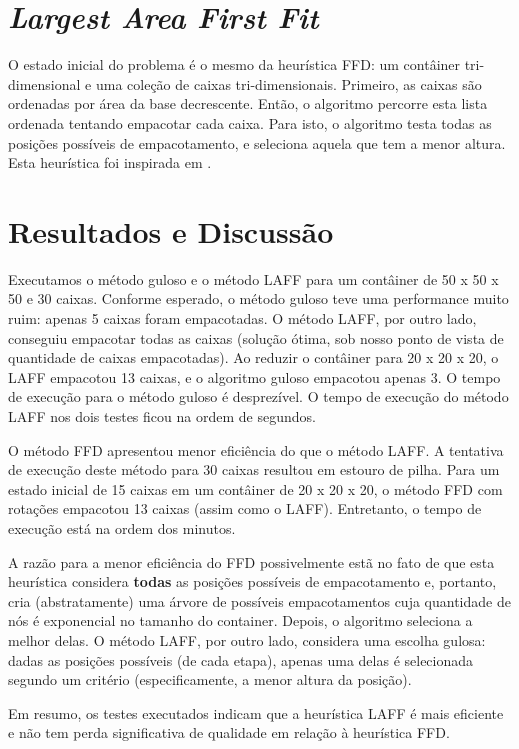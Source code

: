 \documentclass[12pt]{article}
\begin{document}
\section{\emph{Largest Area First Fit}}

O estado inicial do problema é o mesmo da heurística FFD: um contâiner tri-dimensional e uma coleção de caixas tri-dimensionais. Primeiro, as caixas são ordenadas por área da base decrescente. Então, o algoritmo percorre esta lista ordenada tentando empacotar cada caixa. Para isto, o algoritmo testa todas as posições possíveis de empacotamento, e seleciona aquela que tem a menor altura. Esta heurística foi inspirada em \cite{gurbuz}.

\section{Resultados e Discussão}

Executamos o método guloso e o método LAFF para um contâiner de 50 x 50 x 50 e 30 caixas. Conforme esperado, o método guloso teve uma performance muito ruim: apenas 5 caixas foram empacotadas. O método LAFF, por outro lado, conseguiu empacotar todas as caixas (solução ótima, sob nosso ponto de vista de quantidade de caixas empacotadas). Ao reduzir o contâiner para 20 x 20 x 20, o LAFF empacotou 13 caixas, e o algoritmo guloso empacotou apenas 3. O tempo de execução para o método guloso é desprezível. O tempo de execução do método LAFF nos dois testes ficou na ordem de segundos.

O método FFD apresentou menor eficiência do que o método LAFF. A tentativa de execução deste método para 30 caixas resultou em estouro de pilha. Para um estado inicial de 15 caixas em um contâiner de 20 x 20 x 20, o método FFD com rotações empacotou 13 caixas (assim como o LAFF). Entretanto, o tempo de execução está na ordem dos minutos.

A razão para a menor eficiência do FFD possivelmente estã no fato de que esta heurística considera \textbf{todas} as posições possíveis de empacotamento e, portanto, cria (abstratamente) uma árvore de possíveis empacotamentos cuja quantidade de nós é exponencial no tamanho do container. Depois, o algoritmo seleciona a melhor delas. O método LAFF, por outro lado, considera uma escolha gulosa: dadas as posições possíveis (de cada etapa), apenas uma delas é selecionada segundo um critério (especificamente, a menor altura da posição).

Em resumo, os testes executados indicam que a heurística LAFF é mais eficiente e não tem perda significativa de qualidade em relação à heurística FFD.
\end{document}
